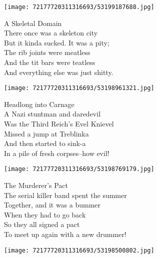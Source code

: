 \documentclass[10pt,letterpaper]{article}
\begin{document}
\begin{center}
\texttt{[image: 72177720311316693/53199187688.jpg]}
\end{center}

\begin{center}
A Skeletal Domain\\
\vskip 0.2in
There once was a skeleton city\\
But it kinda sucked.  It was a pity;\\
The rib joints were meatless\\
And the tit bars were teatless\\
And everything else was just shitty.\\
\end{center}
\pagebreak

\begin{center}\texttt{[image: 72177720311316693/53198961321.jpg]}
\end{center}
\begin{center}
Headlong into Carnage\\
\vskip 0.2in
A Nazi stuntman and daredevil\\
Was the Third Reich's Evel Knievel\\
Missed a jump at Treblinka\\
And then started to sink-a\\
In a pile of fresh corpses--how evil!\\
\end{center}
\pagebreak

\begin{center}\texttt{[image: 72177720311316693/53198769179.jpg]}
\end{center}
\begin{center}
The Murderer's Pact\\
\vskip 0.2in
The serial killer band spent the summer\\
Together, and it was a bummer\\
When they had to go back\\
So they all signed a pact\\
To meet up again with a new drummer!\\
\end{center}
\pagebreak

\begin{center}
\texttt{[image: 72177720311316693/53198500802.jpg]}
\end{center}
\end{document}
